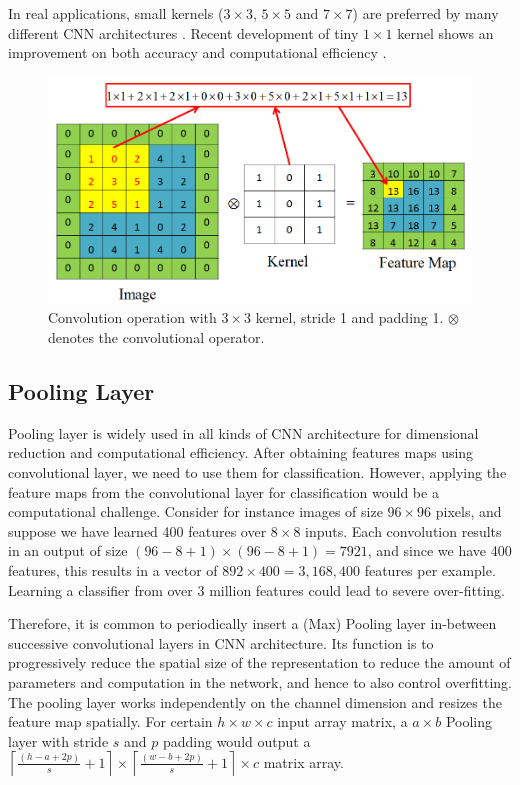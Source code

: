 In real applications, small kernels ($3\times3$, $5\times5$ and $7\times7$) are preferred by many different CNN architectures \cite{krizhevsky2012imagenet} \cite{lecun1998gradient} \cite{simonyan2014very} \cite{zeiler2014visualizing}. Recent development of tiny $1\times1$ kernel shows an improvement on both accuracy and computational efficiency \cite{szegedy2014going}.
\begin{figure}
	\centering
	\includegraphics[scale=.6]{cnn/fig/conv.png}
	\caption{Convolution operation with $3\times3$ kernel, stride 1 and padding 1. $\otimes$ denotes the convolutional operator.} \label{fig:cnn:conv}
\end{figure}

\subsection{Pooling Layer}
Pooling layer is widely used in all kinds of CNN architecture for dimensional reduction and computational efficiency. 
After obtaining features maps using convolutional layer, we need to use them for classification. However, applying the feature maps from the convolutional layer for classification would be a computational challenge. Consider for instance images of size $96\times96$ pixels, and suppose we have learned 400 features over $8\times8$ inputs. Each convolution results in an output of size $(96-8+1)\times(96-8+1)=7921$, and since we have 400 features, this results in a vector of $892\times 400=3,168,400$ features per example. Learning a classifier from over 3 million features could lead to severe over-fitting.

Therefore, it is common to periodically insert a (Max) Pooling layer in-between successive convolutional layers in CNN architecture. Its function is to progressively reduce the spatial size of the representation to reduce the amount of parameters and computation in the network, and hence to also control overfitting. The pooling layer works independently on the channel dimension and resizes the feature map spatially. For certain $h \times w \times c$ input array matrix, a $a \times b$ Pooling layer with stride $s$ and $p$ padding would output a $\left\lceil\frac{(h-a+2p)}{s}+1\right\rceil\times\left\lceil\frac{(w-b+2p)}{s}+1\right\rceil \times c$ matrix array.

